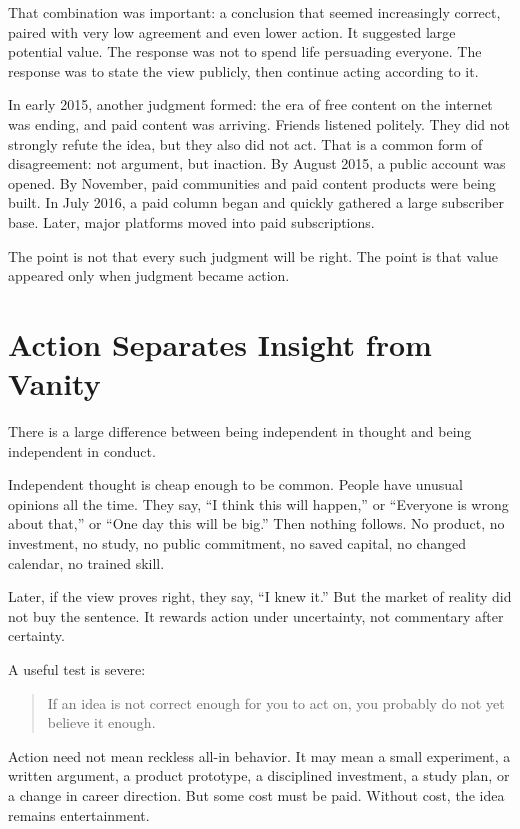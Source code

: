 That combination was important: a conclusion that seemed increasingly correct, paired with very low agreement and even lower action. It suggested large potential value. The response was not to spend life persuading everyone. The response was to state the view publicly, then continue acting according to it.

In early 2015, another judgment formed: the era of free content on the internet was ending, and paid content was arriving. Friends listened politely. They did not strongly refute the idea, but they also did not act. That is a common form of disagreement: not argument, but inaction. By August 2015, a public account was opened. By November, paid communities and paid content products were being built. In July 2016, a paid column began and quickly gathered a large subscriber base. Later, major platforms moved into paid subscriptions.

The point is not that every such judgment will be right. The point is that value appeared only when judgment became action.

\section*{Action Separates Insight from Vanity}

There is a large difference between being independent in thought and being independent in conduct.

Independent thought is cheap enough to be common. People have unusual opinions all the time. They say, ``I think this will happen,'' or ``Everyone is wrong about that,'' or ``One day this will be big.'' Then nothing follows. No product, no investment, no study, no public commitment, no saved capital, no changed calendar, no trained skill.

Later, if the view proves right, they say, ``I knew it.'' But the market of reality did not buy the sentence. It rewards action under uncertainty, not commentary after certainty.

A useful test is severe:

\begin{quote}
If an idea is not correct enough for you to act on, you probably do not yet believe it enough.
\end{quote}

Action need not mean reckless all-in behavior. It may mean a small experiment, a written argument, a product prototype, a disciplined investment, a study plan, or a change in career direction. But some cost must be paid. Without cost, the idea remains entertainment.

